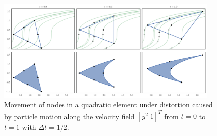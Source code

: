 

\begin{figure}
  \includegraphics[width=0.9375\textwidth]
                  {../images/curved-mesh/element_distortion.pdf}
  \centering
  \caption{Movement of nodes in a quadratic element under distortion caused
    by particle motion along the velocity field \(\left[ y^2 \; 1 \right]^T\)
    from \(t = 0\) to \(t = 1\) with \(\Delta t = 1/2\).}
  \label{fig:element-distortion}
\end{figure}

